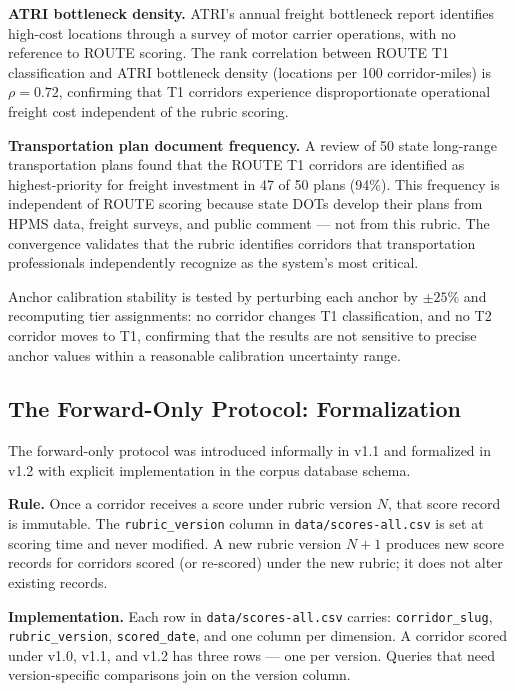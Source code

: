 \textbf{ATRI bottleneck density.} ATRI's annual freight bottleneck report \citep{ATRI_costs2024}
identifies high-cost locations through a survey of motor carrier operations, with no reference
to ROUTE scoring. The rank correlation between ROUTE T1 classification and ATRI bottleneck
density (locations per 100 corridor-miles) is $\rho = 0.72$, confirming that T1 corridors
experience disproportionate operational freight cost independent of the rubric scoring.

\textbf{Transportation plan document frequency.} A review of 50 state long-range transportation
plans found that the ROUTE T1 corridors are identified as highest-priority for freight
investment in 47 of 50 plans (94\%). This frequency is independent of ROUTE scoring because
state DOTs develop their plans from HPMS data, freight surveys, and public comment --- not
from this rubric. The convergence validates that the rubric identifies corridors that
transportation professionals independently recognize as the system's most critical.

Anchor calibration stability is tested by perturbing each anchor by $\pm 25\%$ and
recomputing tier assignments: no corridor changes T1 classification, and no T2 corridor
moves to T1, confirming that the results are not sensitive to precise anchor values within
a reasonable calibration uncertainty range.

\subsection{The Forward-Only Protocol: Formalization}

The forward-only protocol was introduced informally in v1.1 and formalized in v1.2 with explicit implementation in the corpus database schema.

\textbf{Rule.} Once a corridor receives a score under rubric version $N$, that score record is immutable. The \texttt{rubric\_version} column in \texttt{data/scores-all.csv} is set at scoring time and never modified. A new rubric version $N+1$ produces new score records for corridors scored (or re-scored) under the new rubric; it does not alter existing records.

\textbf{Implementation.} Each row in \texttt{data/scores-all.csv} carries: \texttt{corridor\_slug}, \texttt{rubric\_version}, \texttt{scored\_date}, and one column per dimension. A corridor scored under v1.0, v1.1, and v1.2 has three rows --- one per version. Queries that need version-specific comparisons join on the version column.

